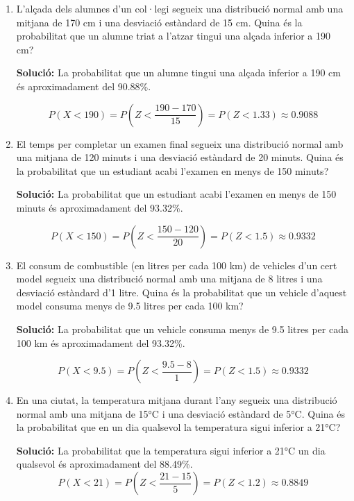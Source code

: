 \documentclass[12pt]{article}
\begin{document}
\begin{exemple}

\begin{enumerate}
    \item L'alçada dels alumnes d'un col·legi segueix una distribució normal amb una mitjana de 170 cm i una desviació estàndard de 15 cm. Quina és la probabilitat que un alumne triat a l'atzar tingui una alçada inferior a 190 cm?
    
    \textbf{Solució:} La probabilitat que un alumne tingui una alçada inferior a 190 cm és aproximadament del 90.88\%.
    
    \[
    P(X < 190) = P\left(Z< \frac{190 - 170}{15} \right) = P(Z< 1.33) \approx 0.9088
    \]

    \item El temps per completar un examen final segueix una distribució normal amb una mitjana de 120 minuts i una desviació estàndard de 20 minuts. Quina és la probabilitat que un estudiant acabi l'examen en menys de 150 minuts?
    
    \textbf{Solució:} La probabilitat que un estudiant acabi l'examen en menys de 150 minuts és aproximadament del 93.32\%.
    
    \[
    P(X < 150) = P\left(Z< \frac{150 - 120}{20} \right) = P(Z< 1.5) \approx 0.9332
    \]


    \item El consum de combustible (en litres per cada 100 km) de vehicles d'un cert model segueix una distribució normal amb una mitjana de 8 litres i una desviació estàndard d'1 litre. Quina és la probabilitat que un vehicle d'aquest model consuma menys de 9.5 litres per cada 100 km?
    
    \textbf{Solució:} La probabilitat que un vehicle consuma menys de 9.5 litres per cada 100 km és aproximadament del 93.32\%.
    
    \[
    P(X < 9.5) = P\left(Z< \frac{9.5 - 8}{1} \right) = P(Z< 1.5) \approx 0.9332
    \]

    \item En una ciutat, la temperatura mitjana durant l'any segueix una distribució normal amb una mitjana de 15°C i una desviació estàndard de 5°C. Quina és la probabilitat que en un dia qualsevol la temperatura sigui inferior a 21°C?
    
    \textbf{Solució:} La probabilitat que la temperatura sigui inferior a 21°C un dia qualsevol és aproximadament del 88.49\%.
    \[
    P(X < 21) = P\left(Z< \frac{21 - 15}{5} \right) = P(Z< 1.2) \approx 0.8849
    \]


\end{enumerate}
\end{exemple}
\end{document}
